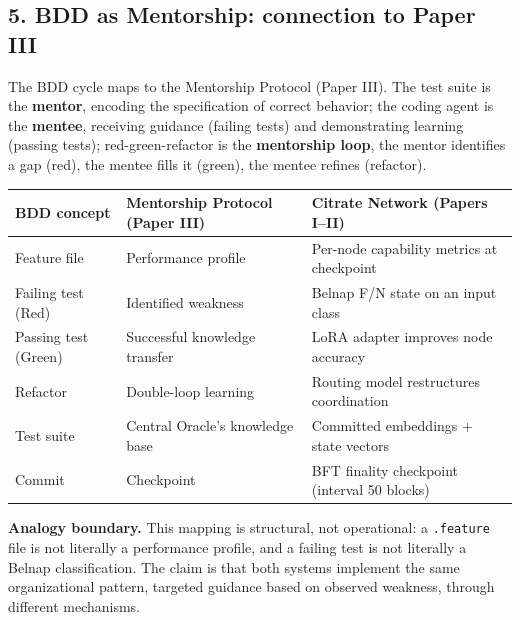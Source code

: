 \subsection{5. BDD as Mentorship: connection to Paper
III}\label{bdd-as-mentorship-connection-to-paper-iii}

The BDD cycle maps to the Mentorship Protocol (Paper III). The test
suite is the \textbf{mentor}, encoding the specification of correct
behavior; the coding agent is the \textbf{mentee}, receiving guidance
(failing tests) and demonstrating learning (passing tests);
red-green-refactor is the \textbf{mentorship loop}, the mentor
identifies a gap (red), the mentee fills it (green), the mentee refines
(refactor).

{\def\LTcaptype{none} %
\begin{longtable}[]{@{}
  >{\raggedright\arraybackslash}p{}
  >{\raggedright\arraybackslash}p{}
  >{\raggedright\arraybackslash}p{}@{}}
\toprule\noalign{}
\begin{minipage}[b]{\linewidth}\raggedright
BDD concept
\end{minipage} & \begin{minipage}[b]{\linewidth}\raggedright
Mentorship Protocol (Paper III)
\end{minipage} & \begin{minipage}[b]{\linewidth}\raggedright
Citrate Network (Papers I--II)
\end{minipage} \\
\midrule\noalign{}
\endhead
\bottomrule\noalign{}
\endlastfoot
Feature file & Performance profile & Per-node capability metrics at
checkpoint \\
Failing test (Red) & Identified weakness & Belnap F/N state on an input
class \\
Passing test (Green) & Successful knowledge transfer & LoRA adapter
improves node accuracy \\
Refactor & Double-loop learning & Routing model restructures
coordination \\
Test suite & Central Oracle's knowledge base & Committed embeddings +
state vectors \\
Commit & Checkpoint & BFT finality checkpoint (interval 50 blocks) \\
\end{longtable}
}

\textbf{Analogy boundary.} This mapping is structural, not operational:
a \texttt{.feature} file is not literally a performance profile, and a
failing test is not literally a Belnap classification. The claim is that
both systems implement the same organizational pattern, targeted
guidance based on observed weakness, through different mechanisms.

